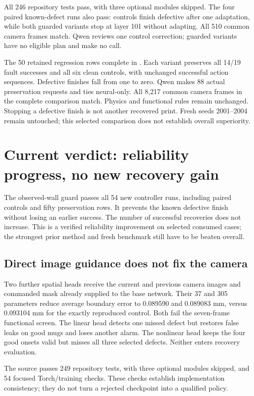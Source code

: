 \documentclass[10pt,letterpaper]{article}
\newcommand{\code}[1]{\texttt{\detokenize{#1}}}
\begin{document}
All 246 repository tests pass, with three optional modules skipped. The four
paired known-defect runs also pass: controls finish defective after one
adaptation, while both guarded variants stop at layer 101 without adapting.
All 510 common camera frames match. Qwen reviews one control correction;
guarded variants have no eligible plan and make no call.

The 50 retained regression rows complete in
\code{neural-recovery:observed-wall-v62}. Each variant preserves all 14/19 fault
successes and all six clean controls, with unchanged successful action sequences.
Defective finishes fall from one to zero. Qwen makes 88 actual preservation
requests and ties neural-only. All 8,217 common camera frames in the complete
comparison match. Physics and functional rules remain unchanged. Stopping a
defective finish is not another recovered print. Fresh seeds 2001--2004 remain
untouched; this selected comparison does not establish overall superiority.

\clearpage
\section{Current verdict: reliability progress, no new recovery gain}
The observed-wall guard passes all 54 new controller runs, including paired
controls and fifty preservation rows. It prevents the known defective finish
without losing an earlier success. The number of successful recoveries does not
increase. This is a verified reliability improvement on selected consumed cases;
the strongest prior method and fresh benchmark still have to be beaten overall.

\subsection*{Direct image guidance does not fix the camera}
Two further spatial heads receive the current and previous camera images and
commanded mask already supplied to the base network. Their 37 and 305 parameters
reduce average boundary error to 0.089590 and 0.089083 mm, versus 0.093104 mm for
the exactly reproduced control. Both fail the seven-frame functional screen.
The linear head detects one missed defect but restores false leaks on good mugs
and loses another alarm. The nonlinear head keeps the four good onsets valid but
misses all three selected defects. Neither enters recovery evaluation.

The source passes 249 repository tests, with three optional modules skipped,
and 54 focused Torch/training checks. These checks establish implementation
consistency; they do not turn a rejected checkpoint into a qualified policy.
\end{document}

